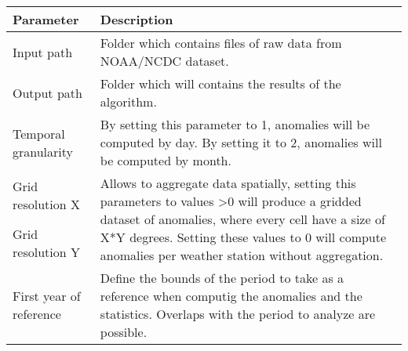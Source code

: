 \documentclass[12pt]{article}
\begin{document}
\begin{table}[h]
\begin{tabularx}{\textwidth}{|X|X|}
\hline
\textbf{Parameter}      & \textbf{Description}                                                                                                                                                                                                                                                                     \\ \hline
Input path              & Folder which contains files of raw data from NOAA/NCDC dataset.                                                                                                                                                                                                                          \\ \hline
Output path             & Folder which will contains the results of the algorithm.                                                                                                                                                                                                                                 \\ \hline
Temporal granularity    & By setting this parameter to 1, anomalies will be computed by day. By setting it to 2, anomalies will be computed by month.                                                                                                                                                              \\ \hline
Grid resolution X       & \multirow{2}{*}{\begin{minipage}{0.5in}Allows to aggregate data spatially, setting this parameters to values \textgreater0 will produce a gridded dataset of anomalies, where every cell have a size of X*Y degrees. Setting these values to 0 will compute anomalies per weather station without aggregation.\end{minipage}} \\ \cline{1-1}
Grid resolution Y       &                                                                                                                                                                                                                                                                                          \\ \hline
First year of reference & \multirow{2}{*}{Define the bounds of the period to take as a reference when computig the anomalies and the statistics. Overlaps with the period to analyze are possible.}                                                                                                                \\ \cline{1-1}

\end{tabularx}
\end{table}
\end{document}
